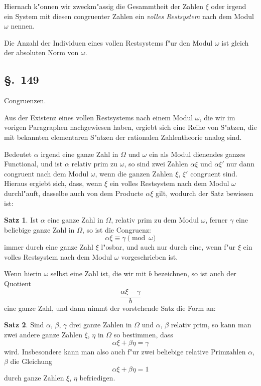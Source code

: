 \documentclass[12pt,a4paper]{article}
\theoremstyle{definition}
\newtheorem*{satz}{Satz}
\begin{document}
Hiernach k"onnen wir zweckm"assig die Gesammtheit der Zahlen $\xi$ oder irgend ein System mit diesen congruenter Zahlen ein \emph{volles Restsystem} nach dem Modul $\omega$ nennen.

Die Anzahl der Individuen eines vollen Restsystems f"ur den Modul $\omega$ ist gleich der absoluten Norm von $\omega$.

\subsection*{\S.~149}

Congruenzen.

Aus der Existenz eines vollen Restsystems nach einem Modul $\omega$, die wir im vorigen Paragraphen nachgewiesen haben, ergiebt sich eine Reihe von S"atzen, die mit bekannten elementaren S"atzen der rationalen Zahlentheorie analog sind.

Bedeutet $\alpha$ irgend eine ganze Zahl in $\Omega$ und $\omega$ ein als Modul dienendes ganzes Functional, und ist $\alpha$ relativ prim zu $\omega$, so sind zwei Zahlen $\alpha\xi$ und $\alpha\xi'$ nur dann congruent nach dem Modul $\omega$, wenn die ganzen Zahlen $\xi$, $\xi'$ congruent sind. Hieraus ergiebt sich, dass, wenn $\xi$ ein volles Restsystem nach dem Modul $\omega$ durchl"auft, dasselbe auch von dem Producte $\alpha\xi$ gilt, wodurch der Satz bewiesen ist:

\begin{satz}
Ist $\alpha$ eine ganze Zahl in $\Omega$, relativ prim zu dem Modul $\omega$, ferner $\gamma$ eine beliebige ganze Zahl in $\Omega$, so ist die Congruenz:
\begin{equation}
\alpha\xi \equiv \gamma \pmod{\omega}
\end{equation}
immer durch eine ganze Zahl $\xi$ l"osbar, und auch nur durch eine, wenn f"ur $\xi$ ein volles Restsystem nach dem Modul $\omega$ vorgeschrieben ist.
\end{satz}

Wenn hierin $\omega$ selbst eine Zahl ist, die wir mit $b$ bezeichnen, so ist auch der Quotient
\begin{equation}
\frac{\alpha\xi - \gamma}{b}
\end{equation}
eine ganze Zahl, und dann nimmt der vorstehende Satz die Form an:

\begin{satz}
Sind $\alpha$, $\beta$, $\gamma$ drei ganze Zahlen in $\Omega$ und $\alpha$, $\beta$ relativ prim, so kann man zwei andere ganze Zahlen $\xi$, $\eta$ in $\Omega$ so bestimmen, dass
\begin{equation}
\alpha\xi + \beta\eta = \gamma
\end{equation}
wird. Insbesondere kann man also auch f"ur zwei beliebige relative Primzahlen $\alpha$, $\beta$ die Gleichung
\begin{equation}
\alpha\xi + \beta\eta = 1
\end{equation}
durch ganze Zahlen $\xi$, $\eta$ befriedigen.
\end{satz}
\end{document}
